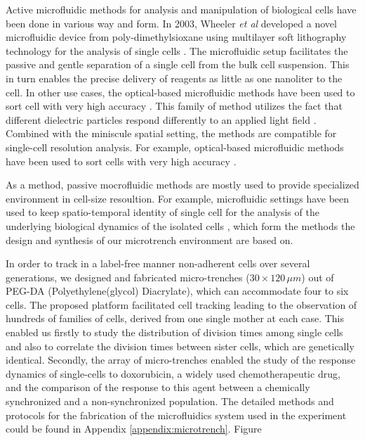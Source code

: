 \documentclass[pdftex,12pt,a4paper]{report}
\begin{document}
Active microfluidic methods for analysis and manipulation of biological cells have been done in various way and form. In 2003, Wheeler \textit{et al} developed a novel microfluidic device from poly-dimethylsioxane using multilayer soft lithography technology for the analysis of single cells \cite{wheeler2003microfluidic}. The microfluidic setup facilitates the passive and gentle separation of a single cell from the bulk cell suspension. This in turn enables the precise delivery of reagents as little as one nanoliter to the cell. In other use cases, the optical-based microfluidic methods have been used to sort cell with very high accuracy \cite{macdonald2003microfluidic}. This family of method utilizes the fact that different dielectric particles respond differently to an applied light field \cite{tatarkova2003brownian}. Combined with the miniscule spatial setting, the methods are compatible for single-cell resolution analysis. For example, optical-based microfluidic methods have been used to sort cells with very high accuracy \cite{macdonald2003microfluidic, wang2005microfluidic, baret2009fluorescence}.

As a method, passive mocrofluidic methods are mostly used to provide specialized environment in cell-size resoultion. For example, microfluidic settings have been used to keep spatio-temporal identity of single cell for the analysis of the underlying biological dynamics of the isolated cells \cite{mu2013microfluidics, sekhavati2015marker}, which form the methods the design and synthesis of our microtrench environment are based on.

In order to track in a label-free manner non-adherent cells over several generations, we designed and fabricated micro-trenches ($30 \times 120 \, \mu m$) out of PEG-DA (Polyethylene(glycol) Diacrylate), which can accommodate four to six cells. The proposed platform facilitated cell tracking leading to the observation of hundreds of families of cells, derived from one single mother at each case. This enabled us firstly to study the distribution of division times among single cells and also to correlate the division times between sister cells, which are genetically identical. Secondly, the array of micro-trenches enabled the study of the response dynamics of single-cells to doxorubicin, a widely used chemotherapeutic drug, and the comparison of the response to this agent between a chemically synchronized and a non-synchronized population. The detailed methods and protocols for the fabrication of the microfluidics system used in the experiment could be found in Appendix \ref{appendix:microtrench}. Figure 
\end{document}
